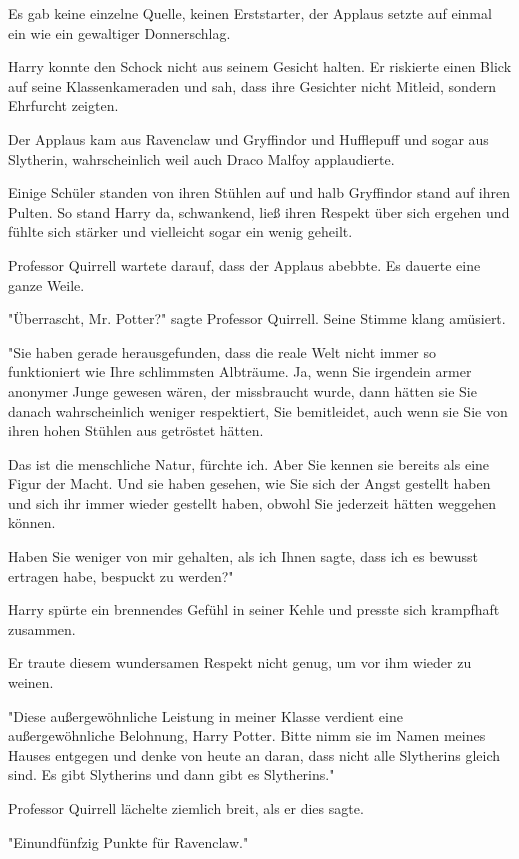 {Es gab keine einzelne Quelle, keinen Erststarter, der Applaus setzte auf einmal ein wie ein gewaltiger Donnerschlag.

Harry konnte den Schock nicht aus seinem Gesicht halten. Er riskierte einen Blick auf seine Klassenkameraden und sah, dass ihre Gesichter nicht Mitleid, sondern Ehrfurcht zeigten.

Der Applaus kam aus Ravenclaw und Gryffindor und Hufflepuff und sogar aus Slytherin, wahrscheinlich weil auch Draco Malfoy applaudierte.

Einige Schüler standen von ihren Stühlen auf und halb Gryffindor stand auf ihren Pulten. So stand Harry da, schwankend, ließ ihren Respekt über sich ergehen und fühlte sich stärker und vielleicht sogar ein wenig geheilt.

Professor Quirrell wartete darauf, dass der Applaus abebbte. Es dauerte eine ganze Weile.

"Überrascht, Mr. Potter?" sagte Professor Quirrell. Seine Stimme klang amüsiert.

"Sie haben gerade herausgefunden, dass die reale Welt nicht immer so funktioniert wie Ihre schlimmsten Albträume. Ja, wenn Sie irgendein armer anonymer Junge gewesen wären, der missbraucht wurde, dann hätten sie Sie danach wahrscheinlich weniger respektiert, Sie bemitleidet, auch wenn sie Sie von ihren hohen Stühlen aus getröstet hätten.

Das ist die menschliche Natur, fürchte ich. Aber Sie kennen sie bereits als eine Figur der Macht. Und sie haben gesehen, wie Sie sich der Angst gestellt haben und sich ihr immer wieder gestellt haben, obwohl Sie jederzeit hätten weggehen können.

Haben Sie weniger von mir gehalten, als ich Ihnen sagte, dass ich es bewusst ertragen habe, bespuckt zu werden?"

Harry spürte ein brennendes Gefühl in seiner Kehle und presste sich krampfhaft zusammen.

Er traute diesem wundersamen Respekt nicht genug, um vor ihm wieder zu weinen.

"Diese außergewöhnliche Leistung in meiner Klasse verdient eine außergewöhnliche Belohnung, Harry Potter. Bitte nimm sie im Namen meines Hauses entgegen und denke von heute an daran, dass nicht alle Slytherins gleich sind. Es gibt Slytherins und dann gibt es Slytherins."

Professor Quirrell lächelte ziemlich breit, als er dies sagte.

"Einundfünfzig Punkte für Ravenclaw."

}
